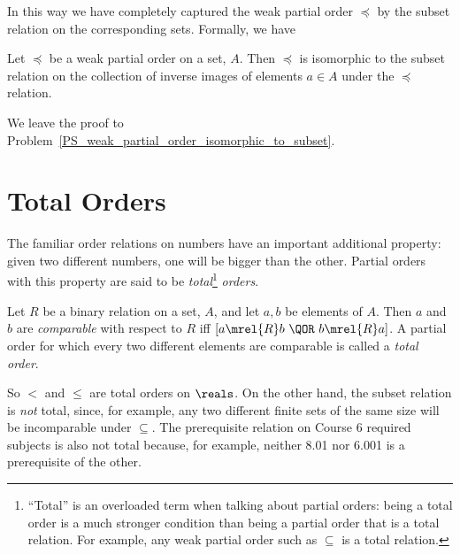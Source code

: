 In this way we have completely captured the weak partial order $\preceq$ by the
subset relation on the corresponding sets.  Formally, we have
\begin{lemma}\label{rgb}
  Let $\preceq$ be a weak partial order on a set, $A$.  Then $\preceq$ is
  isomorphic to the subset relation on the collection of inverse images of
  elements $a \in A$ under the $\preceq$ relation.
\end{lemma}
We leave the proof to
Problem~\ref{PS_weak_partial_order_isomorphic_to_subset}.

\begin{problems}
\classproblems
{}

\homeworkproblems
{}
\end{problems}


\section{Total Orders}

The familiar order relations on numbers have an important additional
property: given two different numbers, one will be bigger than the other.
Partial orders with this property are said to be
\emph{total}\footnote{``Total'' is an overloaded term when talking about
  partial orders: being a total order is a much stronger condition than
  being a partial order that is a total relation.  For example, any weak
  partial order such as $\subseteq$ is a total relation.} \emph{orders}.


\begin{definition}
Let $R$ be a binary relation on a set, $A$, and let $a, b$ be elements of
$A$.  Then $a$ and $b$ are \emph{comparable} with respect to $R$ iff $[a
  \mrel{R} b\ \QOR\ b \mrel{R} a]$.  A partial order for which every two
different elements are comparable is called a \emph{total order}.
\end{definition}

So $<$ and $\le$ are total orders on $\reals$.  On the other hand, the
subset relation is \emph{not} total, since, for example, any two different
finite sets of the same size will be incomparable under $\subseteq$.  The
prerequisite relation on Course 6 required subjects is also not total
because, for example, neither 8.01 nor 6.001 is a prerequisite of the
other.

